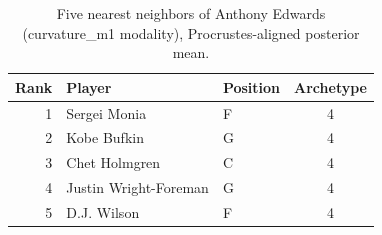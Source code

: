 \begin{table}[htbp]
  \centering\small
  \begin{tabular}{rllc}
    \toprule
    Rank & Player & Position & Archetype \\
    \midrule
    1 & Sergei Monia & F & 4 \\
    2 & Kobe Bufkin & G & 4 \\
    3 & Chet Holmgren & C & 4 \\
    4 & Justin Wright-Foreman & G & 4 \\
    5 & D.J. Wilson & F & 4 \\
    \bottomrule
  \end{tabular}
  \caption{Five nearest neighbors of Anthony Edwards (curvature_m1 modality), Procrustes-aligned posterior mean.}
  \label{tab:Anthony_Edwards_neighbors_curvature_m1}
\end{table}

